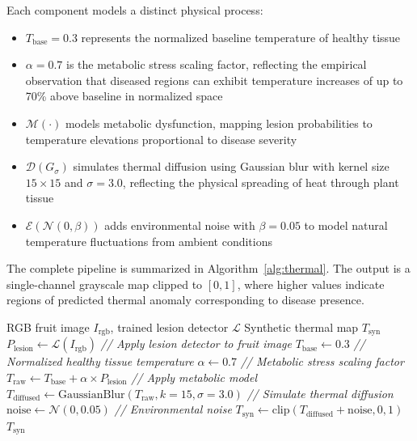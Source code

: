 \documentclass[utf8]{FrontiersinHarvard} %
\begin{document}
Each component models a distinct physical process:
\begin{itemize}
    \item $T_{\text{base}} = 0.3$ represents the normalized baseline temperature of healthy tissue
    \item $\alpha = 0.7$ is the metabolic stress scaling factor, reflecting the empirical observation that diseased regions can exhibit temperature increases of up to 70\% above baseline in normalized space \cite{mahlein2016}
    \item $\mathcal{M}(\cdot)$ models metabolic dysfunction, mapping lesion probabilities to temperature elevations proportional to disease severity
    \item $\mathcal{D}(G_{\sigma})$ simulates thermal diffusion using Gaussian blur with kernel size $15 \times 15$ and $\sigma = 3.0$, reflecting the physical spreading of heat through plant tissue
    \item $\mathcal{E}(\mathcal{N}(0,\beta))$ adds environmental noise with $\beta = 0.05$ to model natural temperature fluctuations from ambient conditions
\end{itemize}

The complete pipeline is summarized in Algorithm~\ref{alg:thermal}. The output is a single-channel grayscale map clipped to $[0, 1]$, where higher values indicate regions of predicted thermal anomaly corresponding to disease presence.

\begin{algorithm}[H]
    \caption{Thermal Synthesis Pipeline}
    \label{alg:thermal}
    \begin{algorithmic}[1]
        \REQUIRE RGB fruit image $I_{\text{rgb}}$, trained lesion detector $\mathcal{L}$
        \ENSURE Synthetic thermal map $T_{\text{syn}}$
        \STATE $P_{\text{lesion}} \leftarrow \mathcal{L}(I_{\text{rgb}})$ \hfill \textit{// Apply lesion detector to fruit image}
        \STATE $T_{\text{base}} \leftarrow 0.3$ \hfill \textit{// Normalized healthy tissue temperature}
        \STATE $\alpha \leftarrow 0.7$ \hfill \textit{// Metabolic stress scaling factor}
        \STATE $T_{\text{raw}} \leftarrow T_{\text{base}} + \alpha \times P_{\text{lesion}}$ \hfill \textit{// Apply metabolic model}
        \STATE $T_{\text{diffused}} \leftarrow \text{GaussianBlur}(T_{\text{raw}}, k{=}15, \sigma{=}3.0)$ \hfill \textit{// Simulate thermal diffusion}
        \STATE $\text{noise} \leftarrow \mathcal{N}(0, 0.05)$ \hfill \textit{// Environmental noise}
        \STATE $T_{\text{syn}} \leftarrow \text{clip}(T_{\text{diffused}} + \text{noise}, 0, 1)$
        \RETURN $T_{\text{syn}}$
    \end{algorithmic}
\end{algorithm}
\end{document}
